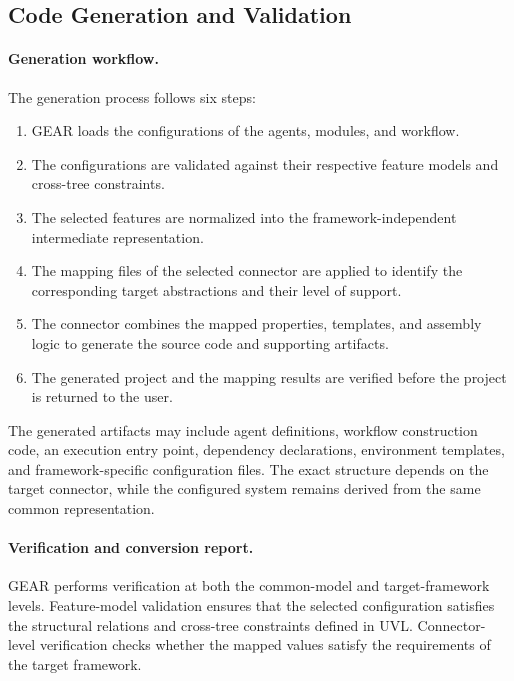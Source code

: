 \subsection{Code Generation and Validation}
\label{subsec:code-generation-validation}

\paragraph{\textbf{Generation workflow.}}
The generation process follows six steps:

\begin{enumerate}
    \item GEAR loads the configurations of the agents, modules, and workflow.

    \item The configurations are validated against their respective feature
    models and cross-tree constraints.

    \item The selected features are normalized into the framework-independent
    intermediate representation.

    \item The mapping files of the selected connector are applied to identify
    the corresponding target abstractions and their level of support.

    \item The connector combines the mapped properties, templates, and assembly
    logic to generate the source code and supporting artifacts.

    \item The generated project and the mapping results are verified before the
    project is returned to the user.
\end{enumerate}

The generated artifacts may include agent definitions, workflow construction
code, an execution entry point, dependency declarations, environment templates,
and framework-specific configuration files. The exact structure depends on the
target connector, while the configured system remains derived from the same
common representation.


\paragraph{\textbf{Verification and conversion report.}}
GEAR performs verification at both the common-model and target-framework
levels. Feature-model validation ensures that the selected configuration
satisfies the structural relations and cross-tree constraints defined in UVL.
Connector-level verification checks whether the mapped values satisfy the
requirements of the target framework.

